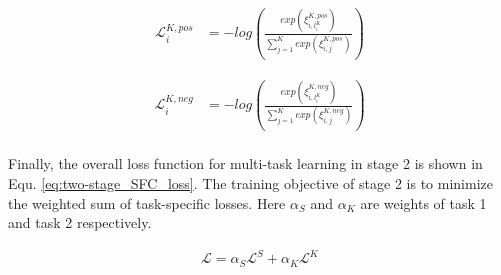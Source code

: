 \begin{equation}
  \begin{aligned}
    \mathcal{L}^{K,pos}_{i} &= -log(\frac{exp(\xi_{i,l^{K}_{i}}^{K,pos})}{\sum_{j=1}^{K}exp(\xi_{i,j}^{K,pos})})
    \label{eq: pos top-k loss}
  \end{aligned}
\end{equation}

\begin{equation}
  \begin{aligned}
    \mathcal{L}^{K,neg}_{i} &= -log(\frac{exp(\xi_{i,l^{K}_{i}}^{K,neg})}{\sum_{j=1}^{K}exp(\xi_{i,j}^{K,neg})}) \\
    \label{eq: neg top-k loss}
  \end{aligned}
\end{equation}

Finally,  the  overall  loss  function for multi-task learning in stage 2 is
shown in Equ. \ref{eq:two-stage_SFC_loss}. The training objective of stage 2 is
to  minimize  the  weighted  sum  of task-specific losses. Here $\alpha_S$ and
$\alpha_K$  are  weights  of  task  1  and  task  2  respectively.

\begin{align}
  \mathcal{L} = \alpha_S \mathcal{L}^S + \alpha_K \mathcal{L}^K
  \label{eq:two-stage_SFC_loss}
\end{align}


